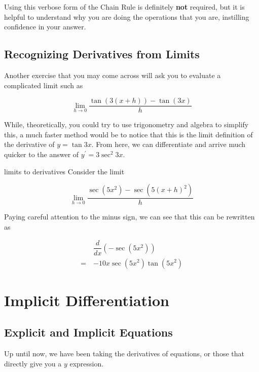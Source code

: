 \begin{tip}
    Using this verbose form of the Chain Rule is definitely \textbf{not} required, but it is helpful to understand why you are doing the operations that you are, instilling confidence in your answer.
\end{tip}

\subsection{Recognizing Derivatives from Limits}

Another exercise that you may come across will ask you to evaluate a complicated limit such as

\[ \lim_{h \to 0} \dfrac{\tan{\left(3 \left(x + h \right) \right)} - \tan{\left( 3x \right)}}{h} \]

While, theoretically, you could try to use trigonometry and algebra to simplify this, a much faster method would be to notice that this is the limit definition of the derivative of \( y = \tan{3x} \). From here, we can differentiate and arrive much quicker to the answer of \( y^\prime = 3\sec^2{3x} \).

\begin{example}{limits to derivatives}
    Consider the limit
    
    \[ \lim_{h \to 0} \dfrac{\sec{\left( 5x^2 \right)} - \sec{\left( 5 \left( x + h \right)^2 \right)}}{h} \]
    
    Paying careful attention to the minus sign, we can see that this can be rewritten as
    
    \begin{align}
        &\dfrac{d}{dx} \left( -\sec{\left( 5x^2 \right)} \right) \\
        = \> &-10x \sec{\left( 5x^2 \right)} \tan{\left( 5x^2 \right)}
    \end{align}
\end{example}

\section{Implicit Differentiation}

\subsection{Explicit and Implicit Equations}

Up until now, we have been taking the derivatives of  equations, or those that directly give you a \( y \) expression.

